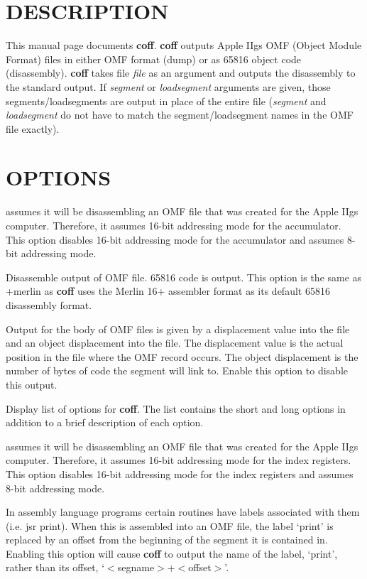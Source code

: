 \bigskip

\section{DESCRIPTION}

\description
This manual page documents {\bf coff}. {\bf coff} outputs Apple IIgs
OMF (Object Module Format) files in either OMF format (dump) or as 65816
object code (disassembly). {\bf coff} takes file {\it file} as an argument
and outputs the disassembly to the standard output. If {\it segment} or
{\it loadsegment} arguments are given, those segments/loadsegments are
output in place of the entire file ({\it segment} and {\it loadsegment}
do not have to match the segment/loadsegment names in the OMF file exactly).

\bigskip

\section{OPTIONS}

 assumes it will be disassembling an OMF
file that was created for the Apple IIgs computer. Therefore, it assumes
16-bit addressing mode for the accumulator. This option disables 16-bit
addressing mode for the accumulator and assumes 8-bit addressing mode.

Disassemble output of OMF file. 65816 code is output. This
option is the same as +merlin as {\bf coff} uses the Merlin 16+ assembler
format as its default 65816 disassembly format.

Output for the body of OMF files is given by a
displacement value into the file and an object displacement into the file.
The displacement value is the actual position in the file where the OMF
record occurs. The object displacement is the number of bytes of code the
segment will link to. Enable this option to disable this output.

Display list of options for {\bf coff}. The list contains
the short and long options in addition to a brief description of each
option.

 assumes it will be disassembling an OMF file
that was created for the Apple IIgs computer. Therefore, it assumes 16-bit
addressing mode for the index registers. This option disables 16-bit
addressing mode for the index registers and assumes 8-bit addressing mode.

In assembly language programs certain routines have
labels associated with them (i.e. {\text jsr print}). When this is assembled
into an OMF file, the label `{\text print}' is replaced by an offset from
the beginning of the segment it is contained in. Enabling this option will
cause {\bf coff} to output the name of the label, `{\text print}', rather
than its offset, `$<$segname$>$+$<$offset$>$'.

